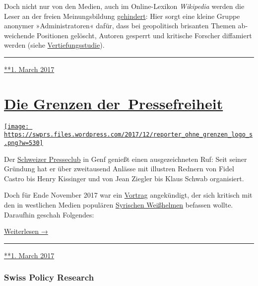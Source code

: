 Doch nicht nur von den Medien, auch im Online-Lexikon \emph{Wikipedia}
werden die Leser an der freien Meinungs­bil­dung
\href{https://swprs.org/propaganda-in-der-wikipedia/}{gehindert}: Hier
sorgt eine kleine Gruppe anonymer »Adminis­tra­toren« dafür, dass bei
geo­po­li­tisch brisanten Themen ab­wei­chende Positionen gelöscht,
Autoren gesperrt und kritische Forscher diffamiert werden (siehe
\href{https://swprs.org/propaganda-in-der-wikipedia/}{Vertiefungsstudie}).

\begin{center}\rule{0.5\linewidth}{\linethickness}\end{center}

\href{https://swprs.org/2017/03/01/leserkommentare/}{**1. March 2017}

\hypertarget{die-grenzen-der-pressefreiheit}{%
\section{\texorpdfstring{\href{https://swprs.org/2017/03/01/die-grenzen-der-pressefreiheit/}{Die
Grenzen
der~Pressefreiheit}}{Die Grenzen der~Pressefreiheit}}\label{die-grenzen-der-pressefreiheit}}

\href{https://swprs.org/2017/03/01/die-grenzen-der-pressefreiheit/}{\texttt{[image: https://swprs.files.wordpress.com/2017/12/reporter\_ohne\_grenzen\_logo\_s.png?w=530]}}

Der \href{http://pressclub.ch/?lang=en}{Schweizer Presseclub} in Genf
genießt einen ausgezeichneten Ruf: Seit seiner Gründung hat er über
zweitausend Anlässe mit illustren Rednern von Fidel Castro bis Henry
Kissinger und von Jean Ziegler bis Klaus Schwab organisiert.

Doch für Ende November 2017 war ein
\href{http://pressclub.ch/they-dont-care-about-us-white-helmets-true-agenda/?lang=en}{Vortrag}
angekündigt, der sich kritisch mit den in west­li­chen Medien populären
\href{https://www.hintergrund.de/globales/kriege/weisse-helme-ohne-weisse-westen/}{Syrischen
Weiß­helmen} befassen wollte. Daraufhin geschah Folgendes:

\href{https://swprs.org/die-grenzen-der-pressefreiheit/}{Weiterlesen →}

\begin{center}\rule{0.5\linewidth}{\linethickness}\end{center}

\href{https://swprs.org/2017/03/01/die-grenzen-der-pressefreiheit/}{**1.
March 2017}

\hypertarget{swiss-policy-research}{%
\subsubsection{Swiss Policy Research}\label{swiss-policy-research}}

